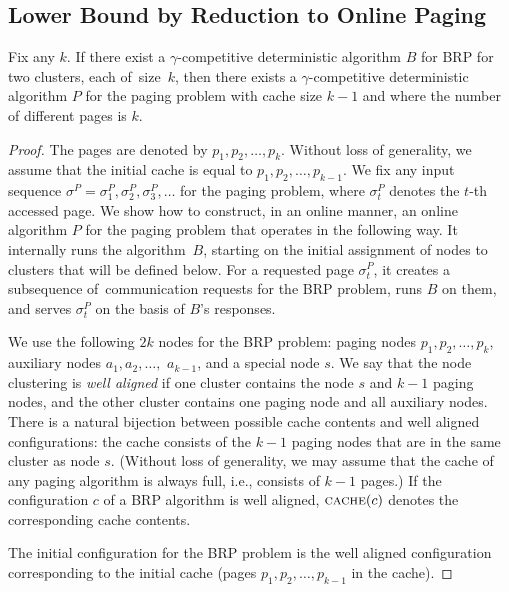 \subsection{Lower Bound by Reduction to Online Paging}
\label{sec:paging}

\begin{theorem}
Fix any $k$. If there exist a $\gamma$-competitive deterministic algorithm $B$
for BRP for two clusters, each of~size~$k$, then there exists a
$\gamma$-competitive deterministic algorithm $P$ for the paging problem with 
cache size $k-1$ and where the number of different pages is $k$.
\end{theorem}

\begin{proof}
The pages are denoted by $p_1,p_2,\ldots,p_k$. Without loss of generality, we
assume that the initial cache is equal to $p_1,p_2,\ldots,p_{k-1}$. We fix any
input sequence $\sigma^P = \sigma^P_1, \sigma^P_2, \sigma^P_3, \ldots$ for the
paging problem, where $\sigma^P_t$ denotes the $t$-th accessed page. We show
how to construct, in an online manner, an online algorithm $P$ for the paging
problem that operates in the following way. It internally runs the algorithm~$B$, 
starting on the initial assignment of nodes to clusters that will be
defined below. For a requested page $\sigma^P_t$, it creates a subsequence
of~communication requests for the BRP problem, runs $B$ on them, and serves
$\sigma^P_t$ on the basis of $B$'s responses.

We use the following $2k$ nodes for the BRP problem: paging nodes $p_1,p_2,
\ldots, p_k$, auxiliary nodes $a_1,a_2,\ldots,$ $a_{k-1}$, and a special node
$s$. We say that the node clustering is \emph{well aligned} if one cluster
contains the node $s$ and $k-1$ paging nodes, and the other cluster contains
one paging node and all auxiliary nodes. There is a natural bijection between
possible cache contents and well aligned configurations: the cache consists of
the $k-1$ paging nodes that are in the same cluster as node $s$. (Without loss
of generality, we may assume that the cache of any paging algorithm is always
full, i.e., consists of $k-1$ pages.) If the configuration $c$ of a BRP
algorithm is well aligned, $\textsc{cache}(c)$ denotes the corresponding cache
contents.

The initial configuration for the BRP problem is the well aligned
configuration corresponding to the initial cache (pages
$p_1,p_2,\ldots,p_{k-1}$ in the cache).


\end{proof}
